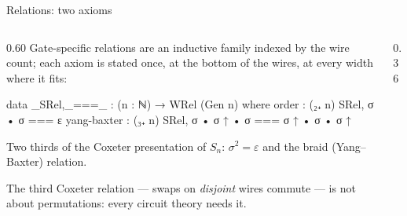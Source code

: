 \begin{frame}{Relations: two axioms \InPaper}
\begin{columns}[c]
\begin{column}{0.60\textwidth}
Gate-specific relations are an inductive family indexed by the wire count;
each axiom is stated \alert{once}, at the bottom of the wires, at every width
where it fits:
\begin{code}
data _SRel,_===_ : (n : ℕ) → WRel (Gen n) where
  order       : (₂₊ n) SRel, σ • σ === ε
  yang-baxter : (₃₊ n) SRel, σ • σ ↑ • σ === σ ↑ • σ • σ ↑
\end{code}
\vspace{4pt}
Two thirds of the \alert{Coxeter presentation} of $S_n$:
$\sigma^2=\varepsilon$ and the braid (Yang--Baxter) relation.

\vspace{4pt}
\small The third Coxeter relation --- swaps on \emph{disjoint} wires commute ---
is not about permutations: every circuit theory needs it.
\end{column}
\begin{column}{0.36\textwidth}
\centering
{}\\[2pt]
\\[12pt]
\\[2pt]
\end{column}
\end{columns}
\end{frame}

